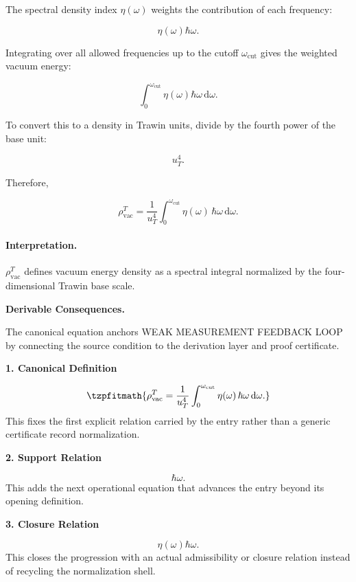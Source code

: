 The spectral density index $\eta(\omega)$ weights the contribution of each frequency:

\begin{equation}
\eta(\omega)\hbar\omega .
\end{equation}

Integrating over all allowed frequencies up to the cutoff $\omega_{\mathrm{cut}}$ gives the weighted vacuum energy:

\begin{equation}
\int_{0}^{\omega_{\mathrm{cut}}}
\eta(\omega)\hbar\omega\,\mathrm{d}\omega .
\end{equation}

To convert this to a density in Trawin units, divide by the fourth power of the base unit:

\begin{equation}
u_T^4 .
\end{equation}

Therefore,

\begin{equation}
\boxed{
\rho_{\mathrm{vac}}^{T}
=
\frac{1}{u_T^4}
\int_{0}^{\omega_{\mathrm{cut}}}
\eta(\omega)\,
\hbar\omega\,
\mathrm{d}\omega .
}
\end{equation}

\paragraph{Interpretation.}
$\rho_{\mathrm{vac}}^{T}$ defines vacuum energy density as a spectral integral normalized by the four-dimensional Trawin base scale.

\par\vspace{0.35em}
\noindent\textbf{Derivable Consequences.}\quad
\begingroup
\footnotesize
\raggedright
The canonical equation anchors WEAK MEASUREMENT FEEDBACK LOOP by connecting the source condition to the derivation layer and proof certificate.
\par\endgroup

\noindent\textbf{1. Canonical Definition}\par
\[
\tzpfitmath{\rho_{\mathrm{vac}}^{T} = \frac{1}{u_T^4} \int_{0}^{\omega_{\mathrm{cut}}} \eta(\omega)\, \hbar\omega\, \mathrm{d}\omega.}
\]
\noindent This fixes the first explicit relation carried by the entry rather than a generic certificate record normalization.\par
\noindent\textbf{2. Support Relation}\par
\[
\hbar\omega.
\]
\noindent This adds the next operational equation that advances the entry beyond its opening definition.\par
\noindent\textbf{3. Closure Relation}\par
\[
\eta(\omega)\hbar\omega.
\]
\noindent This closes the progression with an actual admissibility or closure relation instead of recycling the normalization shell.\par


